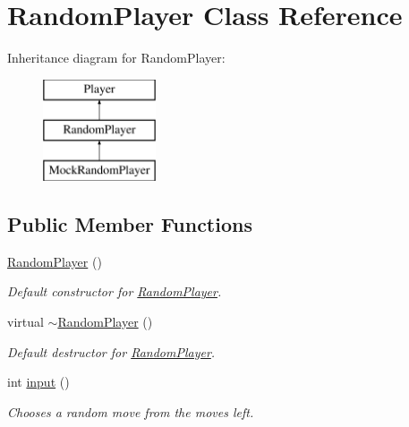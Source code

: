 \hypertarget{classRandomPlayer}{}\section{Random\+Player Class Reference}
\label{classRandomPlayer}
Inheritance diagram for Random\+Player\+:\begin{figure}[H]
\begin{center}
\leavevmode
\includegraphics[height=3.000000cm]{classRandomPlayer}
\end{center}
\end{figure}
\subsection*{Public Member Functions}
\begin{DoxyCompactItemize}
\item 
\mbox{\label{classRandomPlayer_a966ea01a29775e7eb52ff0fffcd34f12}} 
\mbox{\hyperlink{classRandomPlayer_a966ea01a29775e7eb52ff0fffcd34f12}{Random\+Player}} ()
\begin{DoxyCompactList}\small\item\em Default constructor for \mbox{\hyperlink{classRandomPlayer}{Random\+Player}}. \end{DoxyCompactList}\item 
\mbox{\label{classRandomPlayer_aa0bac4df423cda35cbb4639da37bdaaf}} 
virtual \mbox{\hyperlink{classRandomPlayer_aa0bac4df423cda35cbb4639da37bdaaf}{$\sim$\+Random\+Player}} ()
\begin{DoxyCompactList}\small\item\em Default destructor for \mbox{\hyperlink{classRandomPlayer}{Random\+Player}}. \end{DoxyCompactList}\item 
int \mbox{\hyperlink{classRandomPlayer_a4b252647e976a08c1717d8db78bec23d}{input}} ()
\begin{DoxyCompactList}\small\item\em Chooses a random move from the moves left. \end{DoxyCompactList}\end{DoxyCompactItemize}
